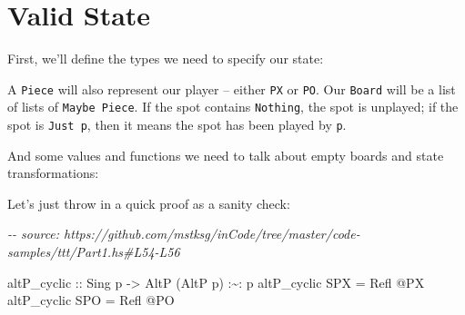 \documentclass[]{article}
\newenvironment{Shaded}{}{}
\newcommand{\CommentTok}[1]{\textcolor[rgb]{0.38,0.63,0.69}{\textit{#1}}}
\newcommand{\DataTypeTok}[1]{\textcolor[rgb]{0.56,0.13,0.00}{#1}}
\newcommand{\NormalTok}[1]{#1}
\newcommand{\OperatorTok}[1]{\textcolor[rgb]{0.40,0.40,0.40}{#1}}
\newcommand{\OtherTok}[1]{\textcolor[rgb]{0.00,0.44,0.13}{#1}}
\begin{document}
\hypertarget{valid-state}{%
\section{Valid State}\label{valid-state}}

First, we'll define the types we need to specify our state:

\begin{Shaded}
\end{Shaded}

A \texttt{Piece} will also represent our player -- either \texttt{PX} or
\texttt{PO}. Our \texttt{Board} will be a list of lists of
\texttt{Maybe\ Piece}. If the spot contains \texttt{Nothing}, the spot is
unplayed; if the spot is \texttt{Just\ p}, then it means the spot has been
played by \texttt{p}.

And some values and functions we need to talk about empty boards and state
transformations:

\begin{Shaded}
\end{Shaded}

Let's just throw in a quick proof as a sanity check:

\begin{Shaded}
\begin{Highlighting}[]
\CommentTok{{-}{-} source: https://github.com/mstksg/inCode/tree/master/code{-}samples/ttt/Part1.hs\#L54{-}L56}

\OtherTok{altP\_cyclic ::} \DataTypeTok{Sing}\NormalTok{ p }\OtherTok{{-}>} \DataTypeTok{AltP}\NormalTok{ (}\DataTypeTok{AltP}\NormalTok{ p) }\OperatorTok{:\textasciitilde{}:}\NormalTok{ p}
\NormalTok{altP\_cyclic }\DataTypeTok{SPX} \OtherTok{=} \DataTypeTok{Refl} \OperatorTok{@}\DataTypeTok{\textquotesingle{}PX}
\NormalTok{altP\_cyclic }\DataTypeTok{SPO} \OtherTok{=} \DataTypeTok{Refl} \OperatorTok{@}\DataTypeTok{\textquotesingle{}PO}
\end{Highlighting}
\end{Shaded}
\end{document}
